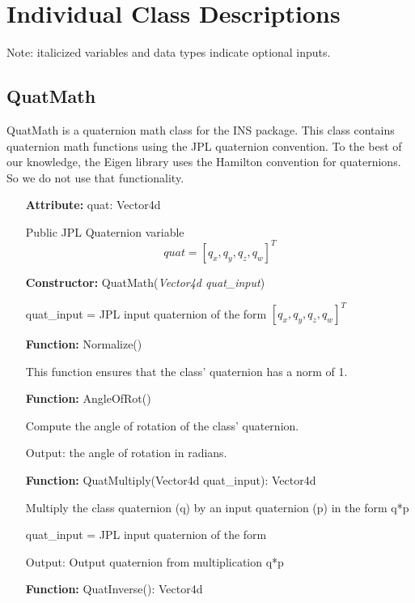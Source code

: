 \documentclass[11pt,a4paper]{article}
\begin{document}
\section{Individual Class Descriptions}

Note: italicized variables and data types indicate optional inputs.

	\subsection{QuatMath}
	QuatMath is a quaternion math class for the INS package. This class contains quaternion math functions using the JPL quaternion convention. To the best of our knowledge, the Eigen library uses the Hamilton convention for quaternions. So we do not use that functionality.
	\begin{itemize}
		\item[\textbf{Attribute:}] quat:  Vector4d
		
		Public JPL Quaternion variable
		\begin{equation*}
			quat = \left[q_x, q_y, q_z, q_w\right]^T
		\end{equation*}
		\item[\textbf{Constructor:}] QuatMath(\textit{Vector4d quat\_input})

		quat\_input = JPL input quaternion of the form $\left[q_x, q_y, q_z, q_w\right]^T$
		
		\item[\textbf{Function:}] Normalize()
		
		This function ensures that the class' quaternion has a norm of 1.
		
		\item[\textbf{Function:}] AngleOfRot()
		
		Compute the angle of rotation of the class' quaternion.
		
		Output: the angle of rotation in radians.
		
		\item[\textbf{Function:}] QuatMultiply(Vector4d quat\_input):  Vector4d
		
		Multiply the class quaternion (q) by an input quaternion (p) in the form q*p
		
		quat\_input = JPL input quaternion of the form 
		
		Output: Output quaternion from multiplication q*p
		
		\item[\textbf{Function:}] QuatInverse():  Vector4d
		

\end{itemize}
\end{document}
